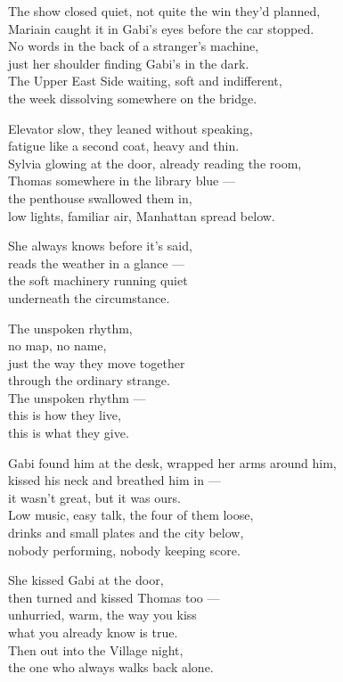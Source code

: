 \begin{lyrics}

The show closed quiet, not quite the win they'd planned,\\
Mariain caught it in Gabi's eyes before the car stopped.\\
No words in the back of a stranger's machine,\\
just her shoulder finding Gabi's in the dark.\\
The Upper East Side waiting, soft and indifferent,\\
the week dissolving somewhere on the bridge.

Elevator slow, they leaned without speaking,\\
fatigue like a second coat, heavy and thin.\\
Sylvia glowing at the door, already reading the room,\\
Thomas somewhere in the library blue —\\
the penthouse swallowed them in,\\
low lights, familiar air, Manhattan spread below.

She always knows before it's said,\\
reads the weather in a glance —\\
the soft machinery running quiet\\
underneath the circumstance.

The unspoken rhythm,\\
no map, no name,\\
just the way they move together\\
through the ordinary strange.\\
The unspoken rhythm —\\
this is how they live,\\
this is what they give.

Gabi found him at the desk, wrapped her arms around him,\\
kissed his neck and breathed him in —\\
it wasn't great, but it was ours.\\
Low music, easy talk, the four of them loose,\\
drinks and small plates and the city below,\\
nobody performing, nobody keeping score.

She kissed Gabi at the door,\\
then turned and kissed Thomas too —\\
unhurried, warm, the way you kiss\\
what you already know is true.\\
Then out into the Village night,\\
the one who always walks back alone.


\end{lyrics}
